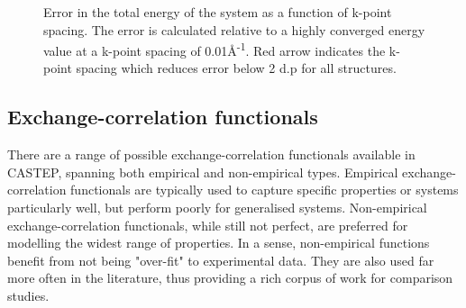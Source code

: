 \begin{figure}
\begin{center}
		\caption{Error in the total energy of the system as a function of k-point spacing. The error is calculated relative to a highly converged energy value at a k-point spacing of 0.01\r{A}\textsuperscript{-1}. Red arrow indicates the k-point spacing which reduces error below 2 d.p for all structures.}
		\label{Figure:kpoint_convergence}
	\end{center}
\end{figure}

\subsection{Exchange-correlation functionals}

There are a range of possible exchange-correlation functionals available in CASTEP, spanning both empirical and non-empirical types. Empirical exchange-correlation functionals are typically used to capture specific properties or systems particularly well, but perform poorly for generalised systems. Non-empirical exchange-correlation functionals, while still not perfect, are preferred for modelling the widest range of properties. In a sense, non-empirical functions benefit from not being "over-fit" to experimental data. They are also used far more often in the literature, thus providing a rich corpus of work for comparison studies.

